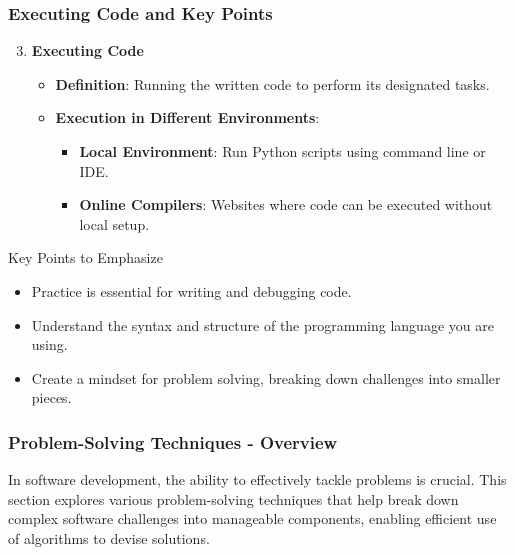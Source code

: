 \documentclass{beamer}
\begin{document}
\begin{frame}[fragile]
    \frametitle{Executing Code and Key Points}
    \begin{enumerate}
        \setcounter{enumi}{2} %
        \item \textbf{Executing Code}
            \begin{itemize}
                \item \textbf{Definition}: Running the written code to perform its designated tasks.
                \item \textbf{Execution in Different Environments}:
                    \begin{itemize}
                        \item \textbf{Local Environment}: Run Python scripts using command line or IDE.
                        \item \textbf{Online Compilers}: Websites where code can be executed without local setup.
                    \end{itemize}
            \end{itemize}
    \end{enumerate}

    \begin{block}{Key Points to Emphasize}
        \begin{itemize}
            \item Practice is essential for writing and debugging code.
            \item Understand the syntax and structure of the programming language you are using.
            \item Create a mindset for problem solving, breaking down challenges into smaller pieces.
        \end{itemize}
    \end{block}
\end{frame}

\begin{frame}
    \frametitle{Problem-Solving Techniques - Overview}
    In software development, the ability to effectively tackle problems is crucial. This section explores various problem-solving techniques that help break down complex software challenges into manageable components, enabling efficient use of algorithms to devise solutions.
\end{frame}
\end{document}
